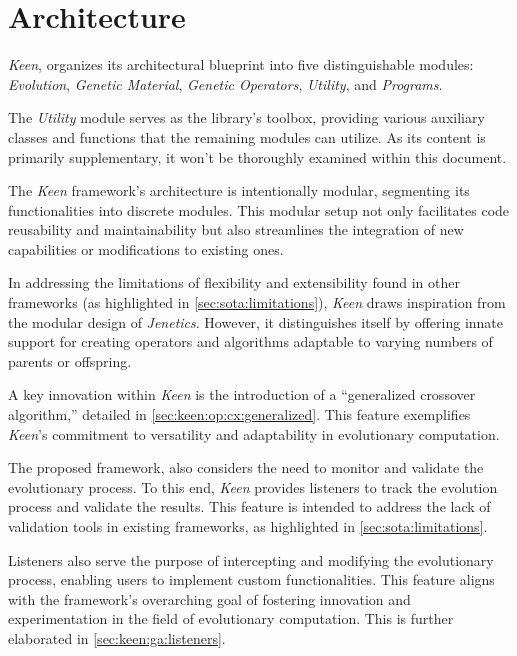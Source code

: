 \section{Architecture}
\label{sec:architecture}
    \textit{Keen}, organizes its architectural blueprint into five distinguishable modules: 
    \textit{Evolution}, \textit{Genetic Material}, \textit{Genetic Operators}, \textit{Utility}, and 
    \textit{Programs}.

    The \emph{Utility} module serves as the library's toolbox, providing various auxiliary classes 
    and functions that the remaining modules can utilize. As its content is primarily supplementary, 
    it won't be thoroughly examined within this document.

    The \textit{Keen} framework's architecture is intentionally modular, segmenting its 
    functionalities into discrete modules. This modular setup not only facilitates code 
    reusability and maintainability but also streamlines the integration of new capabilities or 
    modifications to existing ones.

    In addressing the limitations of flexibility and extensibility found in other frameworks (as 
    highlighted in \vref{sec:sota:limitations}), \textit{Keen} draws inspiration from the 
    modular design of \textit{Jenetics}. However, it distinguishes itself by offering innate 
    support for creating operators and algorithms adaptable to varying numbers of parents or 
    offspring.

    A key innovation within \textit{Keen} is the introduction of a \enquote{generalized crossover 
    algorithm,} detailed in \vref{sec:keen:op:cx:generalized}. This feature exemplifies 
    \textit{Keen}'s commitment to versatility and adaptability in evolutionary computation.
    
    The proposed framework, also considers the need to monitor and validate the evolutionary
    process. To this end, \textit{Keen} provides listeners to track the evolution process and
    validate the results. This feature is intended to address the lack of validation tools in
    existing frameworks, as highlighted in \vref{sec:sota:limitations}.

    Listeners also serve the purpose of intercepting and modifying the evolutionary process,
    enabling users to implement custom functionalities. This feature aligns with the framework's
    overarching goal of fostering innovation and experimentation in the field of evolutionary
    computation. This is further elaborated in \vref{sec:keen:ga:listeners}.

